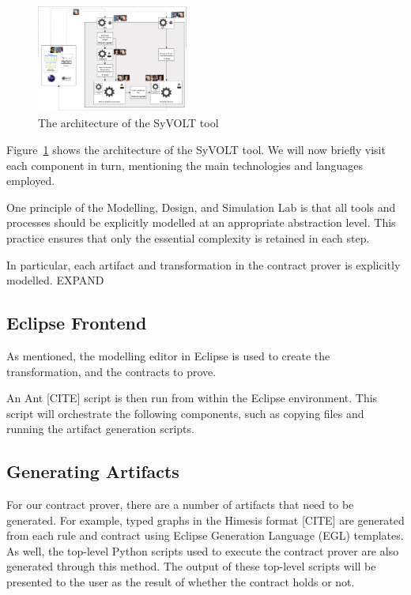 \begin{figure}
\centering
\includegraphics[width=0.45\textwidth]{figures/syvolt_arch}
\caption{The architecture of the SyVOLT tool}
\label{fig:arch}
\end{figure}

Figure~\ref{fig:arch} shows the architecture of the SyVOLT tool. We will now briefly visit each component in turn, mentioning the main technologies and languages employed.


One principle of the Modelling, Design, and Simulation Lab is that all tools and processes should be explicitly modelled at an appropriate abstraction level. This practice ensures that only the essential complexity is retained in each step.

In particular, each artifact and transformation in the contract prover is explicitly modelled. EXPAND

\subsection{Eclipse Frontend}

As mentioned, the modelling editor in Eclipse is used to create the transformation, and the contracts to prove.

An Ant [CITE] script is then run from within the Eclipse environment. This script will orchestrate the following components, such as copying files and running the artifact generation scripts.


\subsection{Generating Artifacts}
For our contract prover, there are a number of artifacts that need to be generated. For example, typed graphs in the Himesis format [CITE] are generated from each rule and contract using Eclipse Generation Language (EGL) templates. As well, the top-level Python scripts used to execute the contract prover are also generated through this method. The output of these top-level scripts will be presented to the user as the result of whether the contract holds or not.


